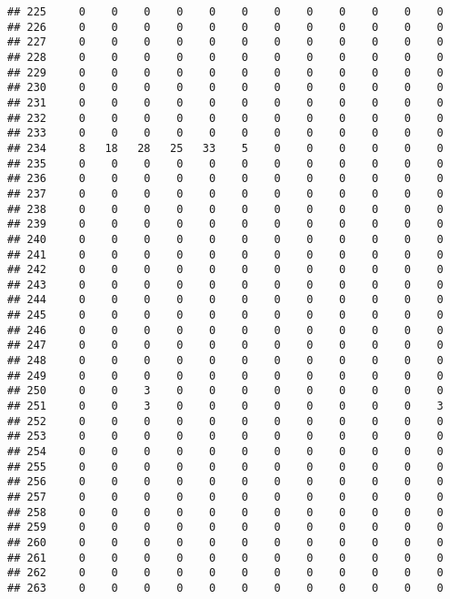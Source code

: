 \documentclass[]{article}
\begin{document}
\begin{verbatim}
## 225     0    0    0    0    0    0    0    0    0    0    0    0
## 226     0    0    0    0    0    0    0    0    0    0    0    0
## 227     0    0    0    0    0    0    0    0    0    0    0    0
## 228     0    0    0    0    0    0    0    0    0    0    0    0
## 229     0    0    0    0    0    0    0    0    0    0    0    0
## 230     0    0    0    0    0    0    0    0    0    0    0    0
## 231     0    0    0    0    0    0    0    0    0    0    0    0
## 232     0    0    0    0    0    0    0    0    0    0    0    0
## 233     0    0    0    0    0    0    0    0    0    0    0    0
## 234     8   18   28   25   33    5    0    0    0    0    0    0
## 235     0    0    0    0    0    0    0    0    0    0    0    0
## 236     0    0    0    0    0    0    0    0    0    0    0    0
## 237     0    0    0    0    0    0    0    0    0    0    0    0
## 238     0    0    0    0    0    0    0    0    0    0    0    0
## 239     0    0    0    0    0    0    0    0    0    0    0    0
## 240     0    0    0    0    0    0    0    0    0    0    0    0
## 241     0    0    0    0    0    0    0    0    0    0    0    0
## 242     0    0    0    0    0    0    0    0    0    0    0    0
## 243     0    0    0    0    0    0    0    0    0    0    0    0
## 244     0    0    0    0    0    0    0    0    0    0    0    0
## 245     0    0    0    0    0    0    0    0    0    0    0    0
## 246     0    0    0    0    0    0    0    0    0    0    0    0
## 247     0    0    0    0    0    0    0    0    0    0    0    0
## 248     0    0    0    0    0    0    0    0    0    0    0    0
## 249     0    0    0    0    0    0    0    0    0    0    0    0
## 250     0    0    3    0    0    0    0    0    0    0    0    0
## 251     0    0    3    0    0    0    0    0    0    0    0    3
## 252     0    0    0    0    0    0    0    0    0    0    0    0
## 253     0    0    0    0    0    0    0    0    0    0    0    0
## 254     0    0    0    0    0    0    0    0    0    0    0    0
## 255     0    0    0    0    0    0    0    0    0    0    0    0
## 256     0    0    0    0    0    0    0    0    0    0    0    0
## 257     0    0    0    0    0    0    0    0    0    0    0    0
## 258     0    0    0    0    0    0    0    0    0    0    0    0
## 259     0    0    0    0    0    0    0    0    0    0    0    0
## 260     0    0    0    0    0    0    0    0    0    0    0    0
## 261     0    0    0    0    0    0    0    0    0    0    0    0
## 262     0    0    0    0    0    0    0    0    0    0    0    0
## 263     0    0    0    0    0    0    0    0    0    0    0    0

\end{verbatim}
\end{document}
